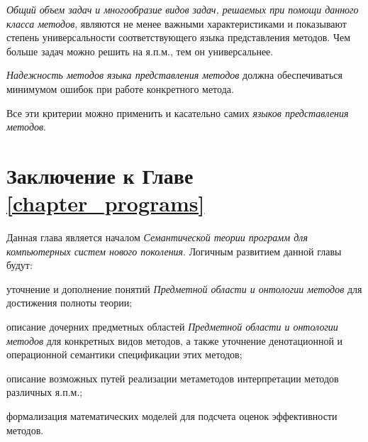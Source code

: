 \textit{Общий объем задач и многообразие видов задач, решаемых при помощи данного класса методов}, являются не менее важными характеристиками и показывают степень универсальности соответствующего языка представления методов. Чем больше задач можно решить на я.п.м., тем он универсальнее.

\textit{Надежность методов языка представления методов} должна обеспечиваться минимумом ошибок при работе конкретного метода.

Все эти критерии можно применить и касательно самих \textit{языков представления методов}.

\section*{Заключение к Главе \ref{chapter_programs}}

Данная глава является началом \textit{Семантической теории программ для компьютерных систем нового поколения}. Логичным развитием данной главы будут:

\begin{textitemize}
    \item уточнение и дополнение понятий \textit{Предметной области и онтологии методов} для достижения полноты теории;
    \item описание дочерних предметных областей \textit{Предметной области и онтологии методов} для конкретных видов методов, а также уточнение денотационной и операционной семантики спецификации этих методов;
    \item описание возможных путей реализации метаметодов интерпретации методов различных я.п.м.;
    \item формализация математических моделей для подсчета оценок эффективности методов.
\end{textitemize}
